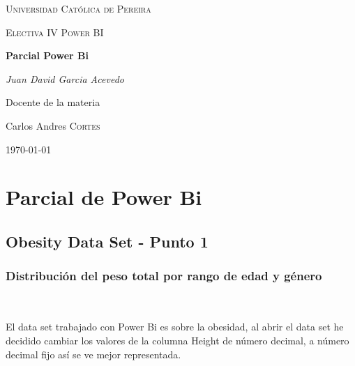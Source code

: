 \documentclass[a4paper]{report} %
\begin{document}
  \begin{titlepage}
    \centering
    {\scshape\LARGE Universidad Católica de Pereira\par}
    \vfill
    {\scshape\LARGE Electiva IV Power BI\par}
    \vfill
    {\huge\bfseries Parcial Power Bi\par}
    \vfill
    {\Large\itshape Juan David Garcia Acevedo\par}
    \vfill
    Docente de la materia\par
	   Carlos Andres \textsc{Cortes}
    \vfill
    {\Large\today\par}
  \end{titlepage}
  \tableofcontents %
    \part{Parcial de Power Bi}
      \chapter{Obesity Data Set - Punto 1}
        \section{Distribución del peso total por rango de edad y género} 
            \paragraph{}\mbox{} \\
            El data set trabajado con Power Bi es sobre la obesidad, al abrir el data set he decidido cambiar los valores de la columna Height de número decimal, a número decimal fijo así se ve mejor representada.\\
\end{document}
